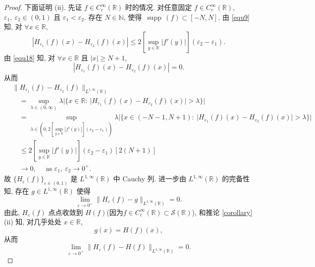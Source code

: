 \documentclass[a4paper,11pt]{article}
\theoremstyle{definition}
\def \supp {\mathop\mathrm{\,supp\,}}
\begin{document}
\begin{proof}
    
    下面证明 (ii). 
    先证 $ f \in C_c^\infty(\mathbb{R}) $ 时的情况.
    对任意固定 $ f \in C_c^\infty(\mathbb{R}) $, 
    $ \varepsilon_1, \ \varepsilon_2 \in (0, 1) $ 且 $ \varepsilon_1 < \varepsilon_2 $.
    存在 $ N \in \mathbb{N} $, 使得 $ \supp(f) \subset [-N, N] $. 
    由 \eqref{equ9} 知, 对 $ \forall x \in \mathbb{R} $, 
    $$
        |H_{\varepsilon_1} (f)(x) - H_{\varepsilon_2} (f)(x)|
            \leq 2 \left[ \sup_{y \in \mathbb{R}} |f'(y)| \right]  (\varepsilon_2 - \varepsilon_1). 
    $$
    由 \eqref{equ18} 知, 对 $ \forall x \in \mathbb{R} $ 且 $ |x| \geq N + 1 $,
    $$
        |H_{\varepsilon_1} (f)(x) - H_{\varepsilon_2} (f)(x)| = 0.
    $$
    从而
    \begin{align*}
        &\| H_{\varepsilon_1} (f) - H_{\varepsilon_2} (f)  \|_{L^{1, \infty}(\mathbb{R})} \\
            &\quad= \sup_{\lambda \in (0, \infty)} 
              \lambda |\{ x \in \mathbb{R} :\ |H_{\varepsilon_1} (f)(x) - H_{\varepsilon_2} (f)(x)| > \lambda \}| \\
            &\quad= \sup_{\lambda \in (0, 2 [\sup_{y \in \mathbb{R}} |f'(y)|] (\varepsilon_2 - \varepsilon_1))} 
              \lambda |\{ x \in (-N-1, N+1) :\ |H_{\varepsilon_1} (f)(x) - H_{\varepsilon_2} (f)(x)| > \lambda \}| \\
            &\quad\leq 2 \left[ \sup_{y \in \mathbb{R}} |f'(y)| \right]  (\varepsilon_2 - \varepsilon_1) [2 (N+1)] \\
            &\quad\to 0, \quad \text{ as } \varepsilon_1, \ \varepsilon_2 \to 0^+.
    \end{align*}
    故 $ \{ H_\varepsilon (f) \}_{\varepsilon \in (0, 1)} $ 是 $ L^{1, \infty}(\mathbb{R}) $ 中 Cauchy 列.  
    进一步由 $ L^{1, \infty}(\mathbb{R}) $ 的完备性知, 存在 $ g \in L^{1, \infty}(\mathbb{R}) $ 使得
    $$ 
        \lim_{\varepsilon \to 0^+} \| H_\varepsilon (f) - g \|_{L^{1, \infty}(\mathbb{R})} = 0.
    $$
    由此, $ H_\varepsilon (f) $ 点点收敛到 $ H (f) $(因为$f \in C_c^\infty(\mathbb{R}) \subset \mathcal{S}(\mathbb{R})$),
    和推论 \ref{corollary}(ii) 知, 对几乎处处 $ x \in \mathbb{R} $,
    $$
        g(x) = H (f)(x),
    $$
    从而
    \begin{equation} \label{equ10}
         \lim_{\varepsilon \to 0^+} \| H_\varepsilon (f) - H (f) \|_{L^{1, \infty}(\mathbb{R})} = 0.
    \end{equation}
    

\end{proof}
\end{document}
